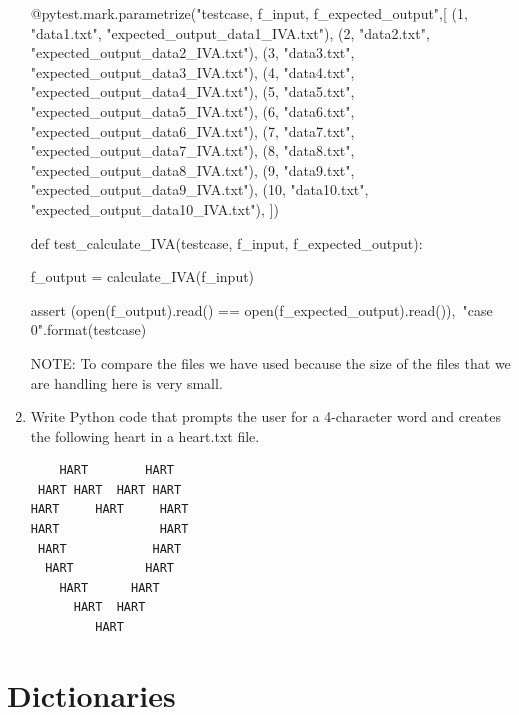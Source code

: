 \documentclass[
  fontsize=10pt,
  a4paper,
]{scrartcl}
\begin{document}
\begin{enumerate}
{\footnotesize
\begin{python}
@pytest.mark.parametrize("testcase, f_input, f_expected_output",[
(1,  "data1.txt",  "expected_output_data1_IVA.txt"),
(2,  "data2.txt",  "expected_output_data2_IVA.txt"),
(3,  "data3.txt",  "expected_output_data3_IVA.txt"),
(4,  "data4.txt",  "expected_output_data4_IVA.txt"),
(5,  "data5.txt",  "expected_output_data5_IVA.txt"),
(6,  "data6.txt",  "expected_output_data6_IVA.txt"),
(7,  "data7.txt",  "expected_output_data7_IVA.txt"),
(8,  "data8.txt",  "expected_output_data8_IVA.txt"),
(9,  "data9.txt",  "expected_output_data9_IVA.txt"),
(10, "data10.txt", "expected_output_data10_IVA.txt"),
])

def test_calculate_IVA(testcase, f_input, f_expected_output):
    
    f_output = calculate_IVA(f_input)

    assert (open(f_output).read() == open(f_expected_output).read()),\
           "case {0}".format(testcase)
\end{python}
}

NOTE: To compare the files we have used  because the size of the files that we are handling here is very small.

\item Write Python code that prompts the user for a 4-character word and creates the following heart in a heart.txt file.\\

\begin{verbatim}
    HART        HART
 HART HART  HART HART
HART     HART     HART
HART              HART
 HART            HART
  HART          HART
    HART      HART
      HART  HART
         HART
\end{verbatim}

\end{enumerate}


\section{Dictionaries}
\end{document}
